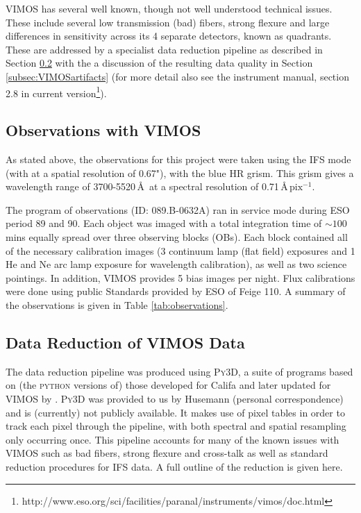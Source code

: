 		VIMOS has several well known, though not well understood technical issues. These include several low transmission (bad) fibers, strong flexure and large differences in sensitivity across its 4 separate detectors, known as quadrants. These are addressed by a specialist data reduction pipeline as described in Section \ref{subsec:VIMOSreduction} with the a discussion of the resulting data quality in Section \ref{subsec:VIMOSartifacts} (for more detail also see the instrument manual, section 2.8 in current version\footnote{http://www.eso.org/sci/facilities/paranal/instruments/vimos/doc.html}).

	\subsection{Observations with VIMOS}
		As stated above, the observations for this project were taken using the IFS mode (with at a spatial resolution of 0.67"), with the blue HR grism. This grism gives a wavelength range of 3700-5520\,\AA\ at a spectral resolution of 0.71\,\AA\,$\mathrm{pix^{-1}}$. 

		The program of observations (ID: 089.B-0632A) ran in service mode during ESO period 89 and 90. Each object was imaged with a total integration time of $\sim 100$ mins equally spread over three observing blocks (OBs). Each block contained all of the necessary calibration images (3 continuum lamp (flat field) exposures and 1 He and Ne arc lamp exposure for wavelength calibration), as well as two science pointings. In addition, VIMOS provides 5 bias images per night. Flux calibrations were done using public Standards provided by ESO of Feige 110. A summary of the observations is given in Table \ref{tab:observations}.

		


	\subsection{Data Reduction of VIMOS Data}
		\label{subsec:VIMOSreduction}
		The data reduction pipeline was produced using \textsc{Py3D}, a suite of programs based on (the \textsc{python} versions of) those developed for Califa \citep{Sanchez2012, Husemann2013} and later updated for VIMOS by \citet{Husemann2014}. \textsc{Py3D} was provided to us by Husemann (personal correspondence) and is (currently) not publicly available. It  makes use of pixel tables in order to track each pixel through the pipeline, with both spectral and spatial resampling only occurring once. This pipeline accounts for many of the known issues with VIMOS such as bad fibers, strong flexure and cross-talk as well as standard reduction procedures for IFS data. A full outline of the reduction is given here.

